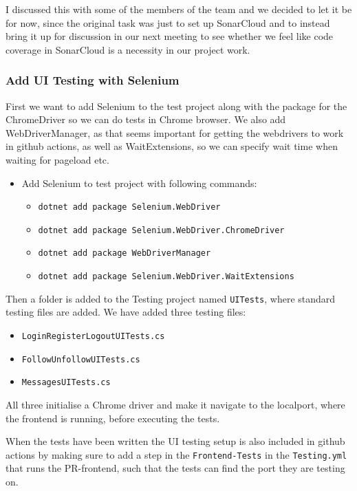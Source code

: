 I discussed this with some of the members of the team and we decided to let it be for now, since the original task was just to set up SonarCloud and to instead bring it up for discussion in our next meeting to see whether we feel like code coverage in SonarCloud is a necessity in our project work.

\subsubsection{Add UI Testing with Selenium}
\label{log:add-ui-testing-with-selenium}
First we want to add Selenium to the test project along with the package for the ChromeDriver so we can do tests in Chrome browser. We also add WebDriverManager, as that seems important for getting the webdrivers to work in github actions, as well as WaitExtensions, so we can specify wait time when waiting for pageload etc.

\begin{itemize}
    \item Add Selenium to test project with following commands:

    \begin{itemize}
        \item \texttt{dotnet\ add\ package\ Selenium.WebDriver}
        \item \texttt{dotnet\ add\ package\ Selenium.WebDriver.ChromeDriver}
        \item \texttt{dotnet\ add\ package\ WebDriverManager}
        \item \texttt{dotnet\ add\ package\ Selenium.WebDriver.WaitExtensions}
    \end{itemize}
\end{itemize}
Then a folder is added to the Testing project named \texttt{UITests}, where standard testing files are added.
We have added three testing files:

\begin{itemize}
    \item \texttt{LoginRegisterLogoutUITests.cs}
    \item \texttt{FollowUnfollowUITests.cs}
    \item \texttt{MessagesUITests.cs}
\end{itemize}
All three initialise a Chrome driver and make it navigate to the localport, where the frontend is running, before executing the tests.

When the tests have been written the UI testing setup is also included in github actions by making sure to add a step in the \texttt{Frontend-Tests} in the \texttt{Testing.yml} that runs the PR-frontend, such that the tests can find the port they are testing on.

